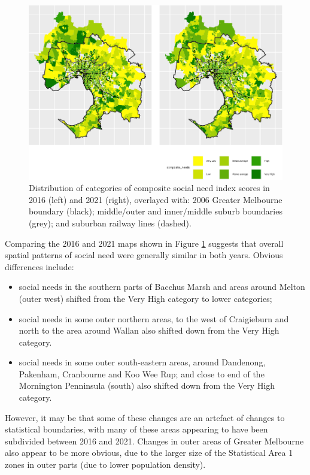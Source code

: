 \documentclass[preprint, 3p,
authoryear]{elsarticle} %
\begin{document}
\begin{figure}
\includegraphics[width=0.9\linewidth]{Leveraging_GTFS_to_assess_transit_supply_Transport_Geography_files/figure-latex/Greater_Melbourne_2016_social_needs-1} \caption{Distribution of categories of composite social need index scores in 2016 (left) and 2021 (right), overlayed with: 2006 Greater Melbourne boundary (black); middle/outer and inner/middle suburb boundaries (grey); and suburban railway lines (dashed).}\label{fig:Greater_Melbourne_2016_social_needs}
\end{figure}

Comparing the 2016 and 2021 maps shown in Figure
\ref{fig:Greater_Melbourne_2016_social_needs} suggests that overall
spatial patterns of social need were generally similar in both years.
Obvious differences include:

\begin{itemize}
\item
  social needs in the southern parts of Bacchus Marsh and areas around
  Melton (outer west) shifted from the Very High category to lower
  categories;
\item
  social needs in some outer northern areas, to the west of Craigieburn
  and north to the area around Wallan also shifted down from the Very
  High category.
\item
  social needs in some outer south-eastern areas, around Dandenong,
  Pakenham, Cranbourne and Koo Wee Rup; and close to end of the
  Mornington Penninsula (south) also shifted down from the Very High
  category.
\end{itemize}

However, it may be that some of these changes are an artefact of changes
to statistical boundaries, with many of these areas appearing to have
been subdivided between 2016 and 2021. Changes in outer areas of Greater
Melbourne also appear to be more obvious, due to the larger size of the
Statistical Area 1 zones in outer parts (due to lower population
density).
\end{document}
